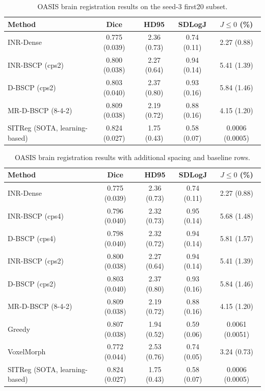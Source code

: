 \begin{table}[t]
\centering
\caption{OASIS brain registration results on the seed-3 first20 subset.}
\label{tab:oasis20-publication-main}
\begin{tabular}{lcccc}
\toprule
Method & Dice & HD95 & SDLogJ & $J\leq 0$ (\%) \\
\midrule
INR-Dense & 0.775 (0.039) & 2.36 (0.73) & 0.74 (0.11) & 2.27 (0.88) \\
INR-BSCP (cps2) & 0.800 (0.038) & 2.27 (0.64) & 0.94 (0.14) & 5.41 (1.39) \\
D-BSCP (cps2) & 0.803 (0.040) & 2.37 (0.80) & 0.93 (0.16) & 5.84 (1.46) \\
MR-D-BSCP (8-4-2) & 0.809 (0.038) & 2.19 (0.72) & 0.88 (0.16) & 4.15 (1.20) \\
SITReg (SOTA, learning-based) & 0.824 (0.027) & 1.75 (0.43) & 0.58 (0.07) & 0.0006 (0.0005) \\
\bottomrule
\end{tabular}
\end{table}

\begin{table}[t]
\centering
\caption{OASIS brain registration results with additional spacing and baseline rows.}
\label{tab:oasis20-publication-extended}
\begin{tabular}{lcccc}
\toprule
Method & Dice & HD95 & SDLogJ & $J\leq 0$ (\%) \\
\midrule
INR-Dense & 0.775 (0.039) & 2.36 (0.73) & 0.74 (0.11) & 2.27 (0.88) \\
INR-BSCP (cps4) & 0.796 (0.040) & 2.32 (0.73) & 0.95 (0.14) & 5.68 (1.48) \\
D-BSCP (cps4) & 0.798 (0.040) & 2.32 (0.72) & 0.94 (0.14) & 5.81 (1.57) \\
INR-BSCP (cps2) & 0.800 (0.038) & 2.27 (0.64) & 0.94 (0.14) & 5.41 (1.39) \\
D-BSCP (cps2) & 0.803 (0.040) & 2.37 (0.80) & 0.93 (0.16) & 5.84 (1.46) \\
MR-D-BSCP (8-4-2) & 0.809 (0.038) & 2.19 (0.72) & 0.88 (0.16) & 4.15 (1.20) \\
Greedy & 0.807 (0.038) & 1.94 (0.52) & 0.59 (0.06) & 0.0061 (0.0051) \\
VoxelMorph & 0.772 (0.044) & 2.53 (0.76) & 0.74 (0.05) & 3.24 (0.73) \\
SITReg (SOTA, learning-based) & 0.824 (0.027) & 1.75 (0.43) & 0.58 (0.07) & 0.0006 (0.0005) \\
\bottomrule
\end{tabular}
\end{table}

